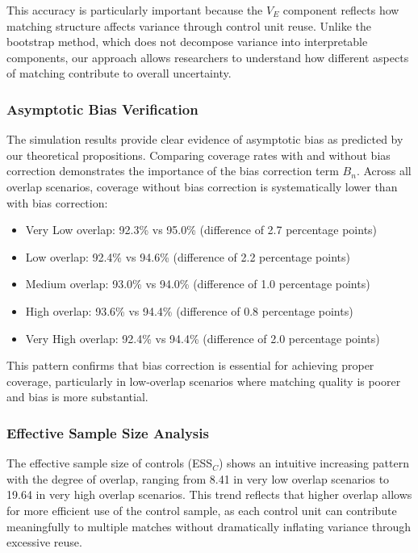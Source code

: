 \documentclass{mytemplate}
\begin{document}
This accuracy is particularly important because the $V_E$ component reflects how matching structure affects variance through control unit reuse. Unlike the bootstrap method, which does not decompose variance into interpretable components, our approach allows researchers to understand how different aspects of matching contribute to overall uncertainty.

\subsubsection{Asymptotic Bias Verification}

The simulation results provide clear evidence of asymptotic bias as predicted by our theoretical propositions. Comparing coverage rates with and without bias correction demonstrates the importance of the bias correction term $B_n$. Across all overlap scenarios, coverage without bias correction is systematically lower than with bias correction:

\begin{itemize}
    \item Very Low overlap: 92.3\% vs 95.0\% (difference of 2.7 percentage points)
    \item Low overlap: 92.4\% vs 94.6\% (difference of 2.2 percentage points)  
    \item Medium overlap: 93.0\% vs 94.0\% (difference of 1.0 percentage points)
    \item High overlap: 93.6\% vs 94.4\% (difference of 0.8 percentage points)
    \item Very High overlap: 92.4\% vs 94.4\% (difference of 2.0 percentage points)
\end{itemize}

This pattern confirms that bias correction is essential for achieving proper coverage, particularly in low-overlap scenarios where matching quality is poorer and bias is more substantial.

\subsubsection{Effective Sample Size Analysis}

The effective sample size of controls (ESS$_C$) shows an intuitive increasing pattern with the degree of overlap, ranging from 8.41 in very low overlap scenarios to 19.64 in very high overlap scenarios. This trend reflects that higher overlap allows for more efficient use of the control sample, as each control unit can contribute meaningfully to multiple matches without dramatically inflating variance through excessive reuse.
\end{document}
